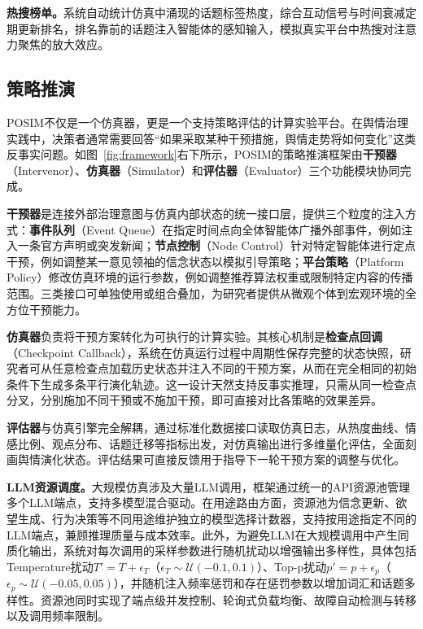 \documentclass[a4paper,fleqn]{cas-dc}
\begin{document}
\textbf{热搜榜单。}系统自动统计仿真中涌现的话题标签热度，综合互动信号与时间衰减定期更新排名，排名靠前的话题注入智能体的感知输入，模拟真实平台中热搜对注意力聚焦的放大效应。

\subsection{策略推演}\label{subsec:strategy}

POSIM不仅是一个仿真器，更是一个支持策略评估的计算实验平台。在舆情治理实践中，决策者通常需要回答“如果采取某种干预措施，舆情走势将如何变化”这类反事实问题。如图~\ref{fig:framework}右下所示，POSIM的策略推演框架由\textbf{干预器}（Intervenor）、\textbf{仿真器}（Simulator）和\textbf{评估器}（Evaluator）三个功能模块协同完成。

\textbf{干预器}是连接外部治理意图与仿真内部状态的统一接口层，提供三个粒度的注入方式：\textbf{事件队列}（Event Queue）在指定时间点向全体智能体广播外部事件，例如注入一条官方声明或突发新闻；\textbf{节点控制}（Node Control）针对特定智能体进行定点干预，例如调整某一意见领袖的信念状态以模拟引导策略；\textbf{平台策略}（Platform Policy）修改仿真环境的运行参数，例如调整推荐算法权重或限制特定内容的传播范围。三类接口可单独使用或组合叠加，为研究者提供从微观个体到宏观环境的全方位干预能力。

\textbf{仿真器}负责将干预方案转化为可执行的计算实验。其核心机制是\textbf{检查点回调}（Checkpoint Callback），系统在仿真运行过程中周期性保存完整的状态快照，研究者可从任意检查点加载历史状态并注入不同的干预方案，从而在完全相同的初始条件下生成多条平行演化轨迹。这一设计天然支持反事实推理，只需从同一检查点分叉，分别施加不同干预或不施加干预，即可直接对比各策略的效果差异。

\textbf{评估器}与仿真引擎完全解耦，通过标准化数据接口读取仿真日志，从热度曲线、情感比例、观点分布、话题迁移等指标出发，对仿真输出进行多维量化评估，全面刻画舆情演化状态。评估结果可直接反馈用于指导下一轮干预方案的调整与优化。

\textbf{LLM资源调度。}大规模仿真涉及大量LLM调用，框架通过统一的API资源池管理多个LLM端点，支持多模型混合驱动。在用途路由方面，资源池为信念更新、欲望生成、行为决策等不同用途维护独立的模型选择计数器，支持按用途指定不同的LLM端点，兼顾推理质量与成本效率。此外，为避免LLM在大规模调用中产生同质化输出，系统对每次调用的采样参数进行随机扰动以增强输出多样性，具体包括Temperature扰动$T' = T + \epsilon_T$（$\epsilon_T \sim \mathcal{U}(-0.1, 0.1)$）、Top-p扰动$p' = p + \epsilon_p$（$\epsilon_p \sim \mathcal{U}(-0.05, 0.05)$），并随机注入频率惩罚和存在惩罚参数以增加词汇和话题多样性。资源池同时实现了端点级并发控制、轮询式负载均衡、故障自动检测与转移以及调用频率限制。
\end{document}
